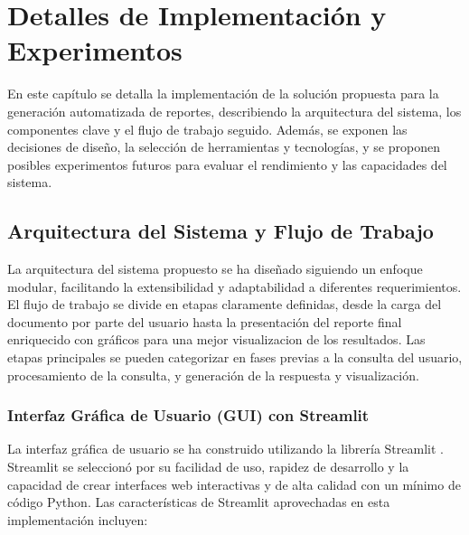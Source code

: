 \chapter{Detalles de Implementación y Experimentos}\label{chapter:implementation}

En este capítulo se detalla la implementación de la solución propuesta para la generación automatizada de reportes, describiendo la arquitectura del sistema, los componentes clave y el flujo de trabajo seguido.  Además, se exponen las decisiones de diseño, la selección de herramientas y tecnologías, y se proponen posibles experimentos futuros para evaluar el rendimiento y las capacidades del sistema.

\section{Arquitectura del Sistema y Flujo de Trabajo}

La arquitectura del sistema propuesto se ha diseñado siguiendo un enfoque modular, facilitando la extensibilidad y adaptabilidad a diferentes requerimientos. El flujo de trabajo se divide en etapas claramente definidas, desde la carga del documento por parte del usuario hasta la presentación del reporte final enriquecido con gráficos para una mejor visualizacion de los resultados. Las etapas principales se pueden categorizar en fases previas a la consulta del usuario, procesamiento de la consulta, y generación de la respuesta y visualización.

\subsection{Interfaz Gráfica de Usuario (GUI) con Streamlit}

La interfaz gráfica de usuario se ha construido utilizando la librería Streamlit \cite{streamlit}.  Streamlit se seleccionó por su facilidad de uso,  rapidez de desarrollo y la capacidad de crear interfaces web interactivas y de alta calidad con un mínimo de código Python.  Las características de Streamlit aprovechadas en esta implementación incluyen:

